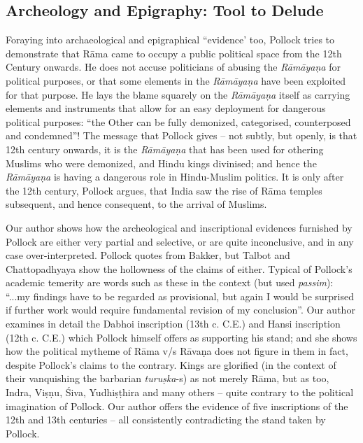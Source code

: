 \subsection*{Archeology and Epigraphy: Tool to Delude}

Foraying into archaeological and epigraphical “evidence’ too, Pollock tries to demonstrate that Rāma came to occupy a public political space from the 12th Century onwards. He does not accuse politicians of abusing the {\sl Rāmāyaṇa} for political purposes, or that some elements in the {\sl Rāmāyaṇa} have been exploited for that purpose. He lays the blame squarely on the {\sl Rāmāyaṇa} itself as carrying elements and instruments that allow for an easy deployment for dangerous political purposes: “the Other can be fully demonized, categorised, counterposed and condemned”! The message that Pollock gives -- not subtly, but openly, is that 12th century onwards, it is the {\sl Rāmāyaṇa} that has been used for othering Muslims who were demonized, and Hindu kings divinised; and hence the {\sl Rāmāyaṇa} is having a dangerous role in Hindu-Muslim politics. It is only after the 12th century, Pollock argues, that India saw the rise of Rāma temples subsequent, and hence consequent, to the arrival of Muslims.

Our author shows how the archeological and inscriptional evidences furnished by Pollock are either very partial and selective, or are quite inconclusive, and in any case over-interpreted. Pollock quotes from Bakker, but Talbot and Chattopadhyaya show the hollowness of the claims of either. Typical of Pollock’s academic temerity are words such as these in the context (but used {\sl passim}): “...my findings have to be regarded as provisional, but again I would be surprised if further work would require fundamental revision of my conclusion”. Our author examines in detail the Dabhoi inscription (13th c. C.E.) and Hansi inscription (12th c. C.E.) which Pollock himself offers as supporting his stand; and she shows how the political mytheme of Rāma v/s Rāvaṇa does not figure in them in fact, despite Pollock's claims to the contrary. Kings are glorified (in the context of their vanquishing the barbarian {\sl turuṣka}-s) as not merely Rāma, but as too, Indra, Viṣṇu, Śiva, Yudhiṣṭhira and many others -- quite contrary to the political imagination of Pollock. Our author offers the evidence of five inscriptions of the 12th and 13th centuries -- all consistently contradicting the stand taken by Pollock.\\[-20pt]

